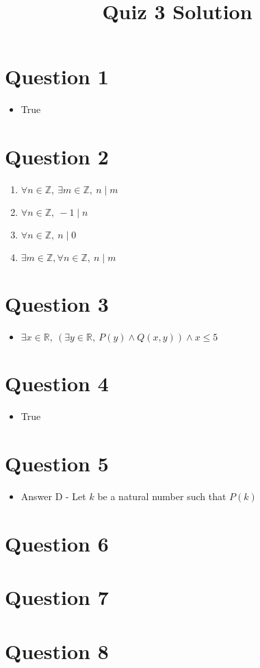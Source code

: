 \documentclass[12pt]{article}
\begin{document}
\title{Quiz 3 Solution}
\maketitle

\section*{Question 1}
\begin{itemize}
    \item True

\end{itemize}

\section*{Question 2}
\begin{enumerate}
    \item $\forall n \in \mathbb{Z},\: \exists m \in \mathbb{Z},\: n \mid m$
    \item $\forall n \in \mathbb{Z},\: -1 \mid n$
    \item $\forall n \in \mathbb{Z},\: n \mid 0$
    \item $\exists m \in \mathbb{Z}, \forall n \in \mathbb{Z},\: n \mid m$
\end{enumerate}

\section*{Question 3}
\begin{itemize}
    \item $\exists x \in \mathbb{R},\:(\exists y \in \mathbb{R},\:P(y) \land Q(x,y)) \land x \leq 5$
\end{itemize}

\section*{Question 4}
\begin{itemize}
    \item True
\end{itemize}

\section*{Question 5}
\begin{itemize}
    \item Answer D - Let $k$ be a natural number such that $P(k)$
\end{itemize}

\section*{Question 6}

\section*{Question 7}

\section*{Question 8}
\end{document}
